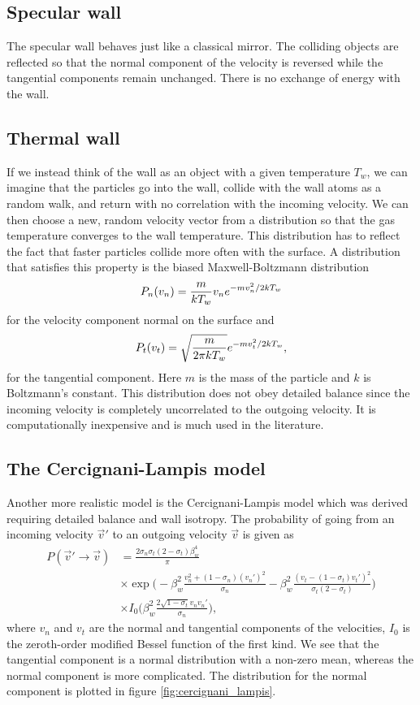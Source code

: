 \subsection{Specular wall}
The specular wall behaves just like a classical mirror. The colliding objects are reflected so that the normal component of the velocity is reversed while the tangential components remain unchanged. There is no exchange of energy with the wall. 

\subsection{Thermal wall}
If we instead think of the wall as an object with a given temperature $T_w$, we can imagine that the particles go into the wall, collide with the wall atoms as a random walk, and return with no correlation with the incoming velocity. We can then choose a new, random velocity vector from a distribution so that the gas temperature converges to the wall temperature. This distribution has to reflect the fact that faster particles collide more often with the surface. A distribution that satisfies this property is the biased Maxwell-Boltzmann distribution
\begin{align}
	P_n(v_n) = {m\over kT_w}v_n e^{-mv_n^2/2kT_w}
\end{align}
for the velocity component normal on the surface and
\begin{align}
	P_t(v_t) = \sqrt{m\over 2\pi kT_w}e^{-mv_t^2/2kT_w},
\end{align}
for the tangential component. Here $m$ is the mass of the particle and $k$ is Boltzmann's constant\cite{alexander1997direct}. This distribution does not obey detailed balance since the incoming velocity is completely uncorrelated to the outgoing velocity. It is computationally inexpensive and is much used in the literature. 
\subsection{The Cercignani-Lampis model}
Another more realistic model is the Cercignani-Lampis model which was derived requiring detailed balance and wall isotropy\cite{cowling1974cercignani}. The probability of going from an incoming velocity $\vec v'$ to an outgoing velocity $\vec v$ is given as
\begin{align}
	\nonumber
	P(\vec v'\rightarrow \vec v) &= \frac{2\sigma_n\sigma_t(2-\sigma_t)\beta_w^4}{\pi}\\
	\nonumber
	&\times\exp\Big(-\beta_w^2\frac{v_n^2 + (1-\sigma_n)(v_n')^2}{\sigma_n} - \beta_w^2\frac{(v_t - (1 - \sigma_t)v_t')^2}{\sigma_t(2 - \sigma_t)}\Big)\\
	&\times I_0\Big(\beta_w^2\frac{2\sqrt{1 - \sigma_t}v_nv_n'}{\sigma_n}\Big),
\end{align}
where $v_n$ and $v_t$ are the normal and tangential components of the velocities, $I_0$ is the zeroth-order modified Bessel function of the first kind. We see that the tangential component is a normal distribution with a non-zero mean, whereas the normal component is more complicated. The distribution for the normal component is plotted in figure \ref{fig:cercignani_lampis}.

